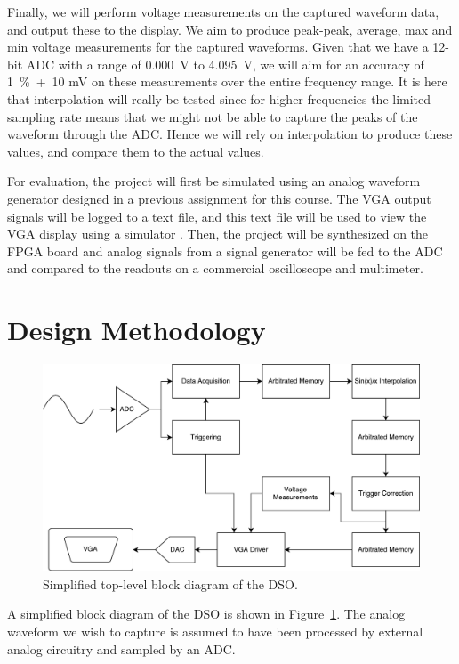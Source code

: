 \documentclass[journal]{IEEEtran}
\begin{document}
Finally, we will perform voltage measurements on the captured waveform data, and output these to the display. We aim to produce peak-peak, average, max and min voltage measurements for the captured waveforms. Given that we have a 12-bit ADC with a range of 0.000~V to 4.095~V, we will aim for an accuracy of 1~\%~+~10 mV on these measurements over the entire frequency range. It is here that interpolation will really be tested since for higher frequencies the limited sampling rate means that we might not be able to capture the peaks of the waveform through the ADC. Hence we will rely on interpolation to produce these values, and compare them to the actual values.

For evaluation, the project will first be simulated using an analog waveform generator designed in a previous assignment for this course. The VGA output signals will be logged to a text file, and this text file will be used to view the VGA display using a simulator \cite{vga_sim}. Then, the project will be synthesized on the FPGA board and analog signals from a signal generator will be fed to the ADC and compared to the readouts on a commercial oscilloscope and multimeter.

\section{Design Methodology}

\begin{figure}[!htb]
  \centering
  \includegraphics[width=\columnwidth]{diagrams/system.pdf}
  \caption{Simplified top-level block diagram of the DSO.}
  \label{fig:system}
\end{figure}

A simplified block diagram of the DSO is shown in Figure~\ref{fig:system}. The analog waveform we wish to capture is assumed to have been processed by external analog circuitry and sampled by an ADC.
\end{document}
